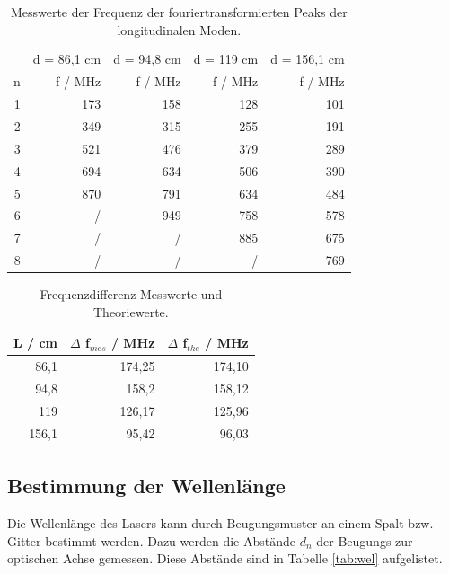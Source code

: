 \begin{table}[H]
  \centering
  \footnotesize
  \caption{Messwerte der Frequenz der fouriertransformierten Peaks der longitudinalen Moden.}
  \label{tab:lon}
  \begin{tabular}{r r r r r}
  \toprule
      & d = 86,1 \: cm & d = 94,8 \: cm & d = 119 \: cm & d = 156,1 \: cm  \\
    n & f / MHz & f / MHz  & f / MHz & f / MHz \\
  \midrule
    1 & 173 & 158 & 128 & 101 \\
    2 & 349 & 315 & 255 & 191 \\
    3 & 521 & 476 & 379 & 289 \\
    4 & 694 & 634 & 506 & 390 \\
    5 & 870 & 791 & 634 & 484 \\
    6 & /   & 949 & 758 & 578 \\
    7 & /   & /   & 885 & 675 \\
    8 & /   & /   & /   & 769 \\
  \bottomrule
  \end{tabular}
\end{table}


\begin{table}[H]
  \centering
  \footnotesize
  \caption{Frequenzdifferenz Messwerte und Theoriewerte.}
  \label{tab:lon2}
  \begin{tabular}{r r r}
  \toprule
    L / cm & $\Delta$ f$_{mes}$ / MHz & $\Delta$ f$_{the}$ / MHz \\
  \midrule
      86,1 & 174,25 & 174,10 \\
      94,8 & 158,2  & 158,12 \\
      119  & 126,17 & 125,96 \\
      156,1& 95,42  & 96,03  \\
  \bottomrule
  \end{tabular}
\end{table}



\subsection{Bestimmung der Wellenlänge}
\label{sec:Bestimmung der Wellenlänge}
Die Wellenlänge des Lasers kann durch Beugungsmuster an einem Spalt bzw. Gitter bestimmt werden. 
Dazu werden die Abstände $d_n$ der Beugungs zur optischen Achse gemessen.
Diese Abstände sind in Tabelle \ref{tab:wel} aufgelistet.

